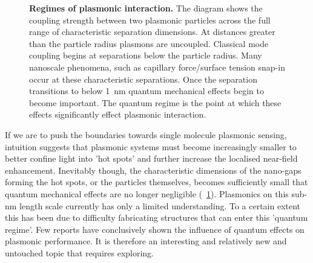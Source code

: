 \documentclass[12pt, a4paper, twoside]{book}
\begin{document}
\begin{figure}[bt]
\centering
{}
\caption[Regimes of plasmonic interaction.]{\textbf{Regimes of plasmonic interaction.} The diagram shows the coupling strength between two plasmonic particles across the full range of characteristic separation dimensions. At distances greater than the particle radius plasmons are uncoupled. Classical mode coupling begins at separations below the particle radius. Many nanoscale phenomena, such as capillary force/surface tension snap-in occur at these characteristic separations. Once the separation transitions to below \SI{1}{nm} quantum mechanical effects begin to become important. The quantum regime is the point at which these effects significantly effect plasmonic interaction.}
\label{fig:plasmonic_regimes}
\vspace{-10pt}
\end{figure}

If we are to push the boundaries towards single molecule plasmonic sensing, intuition suggests that plasmonic systems must become increasingly smaller to better confine light into 'hot spots' and further increase the localised near-field enhancement. Inevitably though, the characteristic dimensions of the nano-gaps forming the hot spots, or the particles themselves, becomes sufficiently small that quantum mechanical effects are no longer negligible (\figurename~\ref{fig:plasmonic_regimes}). Plasmonics on this sub-nm length scale currently has only a limited understanding. To a certain extent this has been due to difficulty fabricating structures that can enter this 'quantum regime'. Few reports have conclusively shown the influence of quantum effects on plasmonic performance.
It is therefore an interesting and relatively new and untouched topic that requires exploring.
\end{document}
